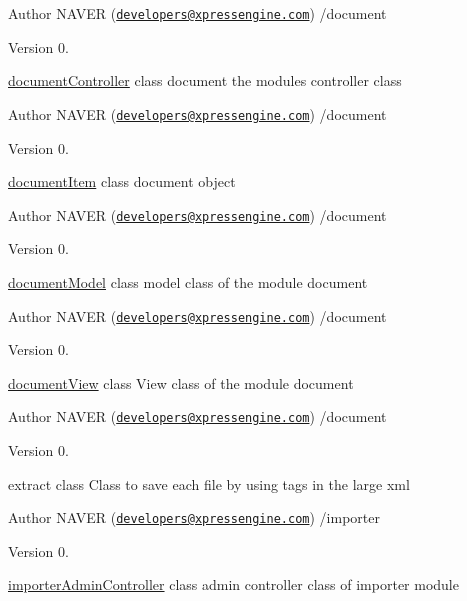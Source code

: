 \begin{DoxyAuthor}{Author}
N\+A\+V\+ER (\href{mailto:developers@xpressengine.com}{\tt developers@xpressengine.\+com}) /document 
\end{DoxyAuthor}
\begin{DoxyVersion}{Version}
0.
\end{DoxyVersion}
\hyperlink{classdocumentController}{document\+Controller} class document the module\textquotesingle{}s controller class

\begin{DoxyAuthor}{Author}
N\+A\+V\+ER (\href{mailto:developers@xpressengine.com}{\tt developers@xpressengine.\+com}) /document 
\end{DoxyAuthor}
\begin{DoxyVersion}{Version}
0.
\end{DoxyVersion}
\hyperlink{classdocumentItem}{document\+Item} class document object

\begin{DoxyAuthor}{Author}
N\+A\+V\+ER (\href{mailto:developers@xpressengine.com}{\tt developers@xpressengine.\+com}) /document 
\end{DoxyAuthor}
\begin{DoxyVersion}{Version}
0.
\end{DoxyVersion}
\hyperlink{classdocumentModel}{document\+Model} class model class of the module document

\begin{DoxyAuthor}{Author}
N\+A\+V\+ER (\href{mailto:developers@xpressengine.com}{\tt developers@xpressengine.\+com}) /document 
\end{DoxyAuthor}
\begin{DoxyVersion}{Version}
0.
\end{DoxyVersion}
\hyperlink{classdocumentView}{document\+View} class View class of the module document

\begin{DoxyAuthor}{Author}
N\+A\+V\+ER (\href{mailto:developers@xpressengine.com}{\tt developers@xpressengine.\+com}) /document 
\end{DoxyAuthor}
\begin{DoxyVersion}{Version}
0.
\end{DoxyVersion}
extract class Class to save each file by using tags in the large xml

\begin{DoxyAuthor}{Author}
N\+A\+V\+ER (\href{mailto:developers@xpressengine.com}{\tt developers@xpressengine.\+com}) /importer 
\end{DoxyAuthor}
\begin{DoxyVersion}{Version}
0.
\end{DoxyVersion}
\hyperlink{classimporterAdminController}{importer\+Admin\+Controller} class admin controller class of importer module

